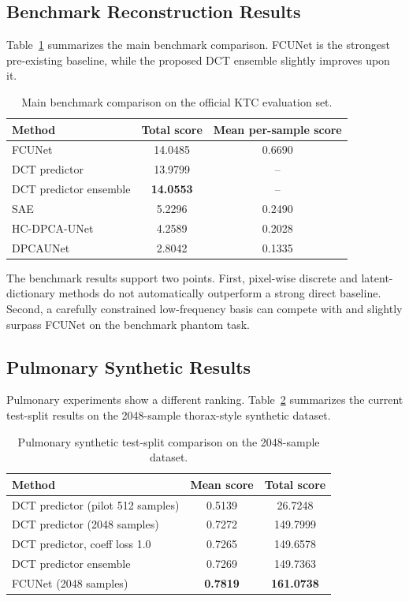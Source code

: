 \documentclass[11pt,a4paper]{article}
\begin{document}
\subsection{Benchmark Reconstruction Results}
Table~\ref{tab:benchmark-main} summarizes the main benchmark comparison. FCUNet is the strongest pre-existing baseline, while the proposed DCT ensemble slightly improves upon it.

\begin{table}[htbp]
    \centering
    \caption{Main benchmark comparison on the official KTC evaluation set.}
    \label{tab:benchmark-main}
    \begin{tabular}{lcc}
        \toprule
        Method & Total score & Mean per-sample score \\
        \midrule
        FCUNet & 14.0485 & 0.6690 \\
        DCT predictor & 13.9799 & -- \\
        DCT predictor ensemble & \textbf{14.0553} & -- \\
        SAE & 5.2296 & 0.2490 \\
        HC-DPCA-UNet & 4.2589 & 0.2028 \\
        DPCAUNet & 2.8042 & 0.1335 \\
        \bottomrule
    \end{tabular}
\end{table}

The benchmark results support two points. First, pixel-wise discrete and latent-dictionary methods do not automatically outperform a strong direct baseline. Second, a carefully constrained low-frequency basis can compete with and slightly surpass FCUNet on the benchmark phantom task.

\subsection{Pulmonary Synthetic Results}
Pulmonary experiments show a different ranking. Table~\ref{tab:pulmonary-main} summarizes the current test-split results on the 2048-sample thorax-style synthetic dataset.

\begin{table}[htbp]
    \centering
    \caption{Pulmonary synthetic test-split comparison on the 2048-sample dataset.}
    \label{tab:pulmonary-main}
    \begin{tabular}{lcc}
        \toprule
        Method & Mean score & Total score \\
        \midrule
        DCT predictor (pilot 512 samples) & 0.5139 & 26.7248 \\
        DCT predictor (2048 samples) & 0.7272 & 149.7999 \\
        DCT predictor, coeff loss 1.0 & 0.7265 & 149.6578 \\
        DCT predictor ensemble & 0.7269 & 149.7363 \\
        FCUNet (2048 samples) & \textbf{0.7819} & \textbf{161.0738} \\
        \bottomrule
    \end{tabular}
\end{table}
\end{document}
